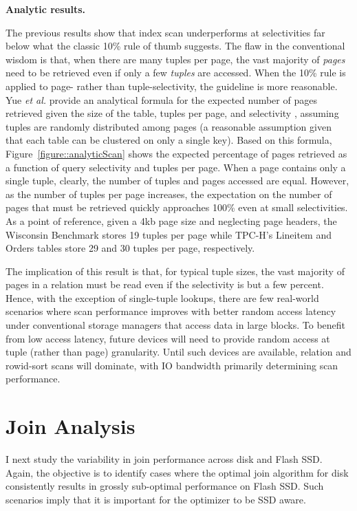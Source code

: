 \textbf{Analytic results.}

The previous results show that index scan underperforms at selectivities far below what the classic 10\% rule of thumb suggests. 
The flaw in the conventional wisdom is that, when there are many tuples per page, the vast majority of \emph{pages} need to be retrieved even if only a few \emph{tuples} are accessed.
When the 10\% rule is applied to page- rather than tuple-selectivity, the guideline is more reasonable.
Yue \emph{et al.} provide an analytical formula for the expected number of pages retrieved given the size of the table, tuples per page, and selectivity \cite{Yue1975}, assuming tuples are randomly distributed among pages (a reasonable assumption given that each table can be clustered on only a single key).
Based on this formula, Figure~\ref{figure::analyticScan} shows the expected percentage of pages retrieved as a function of query selectivity and tuples per page.
When a page contains only a single tuple, clearly, the number of tuples and pages accessed are equal.
However, as the number of tuples per page increases, the expectation on the number of pages that must be retrieved quickly approaches 100\% even at small selectivities.
As a point of reference, given a 4kb page size and neglecting page headers, the Wisconsin Benchmark stores 19 tuples per page while TPC-H's Lineitem and Orders tables store 29 and 30 tuples per page, respectively.

The implication of this result is that, for typical tuple sizes, the vast majority of pages in a relation must be read even if the selectivity is but a few percent.
Hence, with the exception of single-tuple lookups, there are few real-world scenarios where scan performance improves with better random access latency under conventional storage managers that access data in large blocks.
To benefit from low access latency, future devices will need to provide random access at tuple (rather than page) granularity.
Until such devices are available, relation and rowid-sort scans will dominate, with IO bandwidth primarily determining scan performance.

\section{Join Analysis}
\label{sec:FlashOpti:Joins}

I next study the variability in join performance across disk and Flash SSD.  
Again, the objective is to identify cases where the optimal join algorithm for disk consistently results in grossly sub-optimal performance on Flash SSD.
Such scenarios imply that it is important for the optimizer to be SSD aware.


